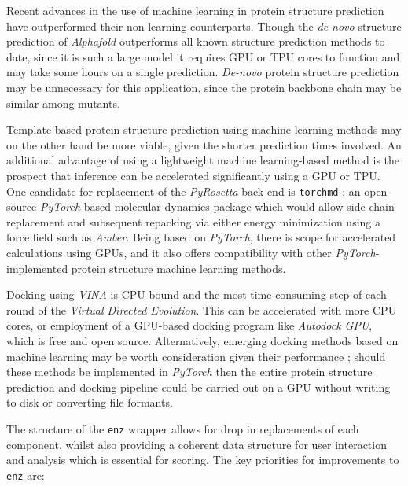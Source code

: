 \documentclass[16pt]{article}
\begin{document}
Recent advances in the use of machine learning in protein structure prediction \cite{jumper2021highly} have outperformed their non-learning counterparts.
Though the \textit{de-novo} structure prediction of \textit{Alphafold} \cite{jumper2021highly} outperforms all known structure prediction methods to date, since it is such a large model it requires GPU or TPU cores to function and may take some hours on a single prediction. 
\textit{De-novo} protein structure prediction may be unnecessary for this application, since the protein backbone chain may be similar among mutants.

Template-based protein structure prediction using machine learning methods may on the other hand be more viable, given the shorter prediction times involved.
An additional advantage of using a lightweight machine learning-based method is the prospect that inference can be accelerated significantly using a GPU or TPU.
One candidate for replacement of the \textit{PyRosetta} back end is \texttt{torchmd} \cite{doerr2021torchmd}: an open-source \textit{PyTorch}-based molecular dynamics package which would allow side chain replacement and subsequent repacking via either energy minimization using a force field such as \textit{Amber}\cite{wang2004development}.
Being based on \textit{PyTorch}, there is scope for accelerated calculations using GPUs, and it also offers compatibility with other \textit{PyTorch}-implemented protein structure machine learning methods.

Docking using \textit{VINA} is CPU-bound and the most time-consuming step of each round of the \textit{Virtual Directed Evolution}.
This can be accelerated with more CPU cores, or employment of a GPU-based docking program like \textit{Autodock GPU}\cite{santos2021accelerating}, which is free and open source.
Alternatively, emerging docking methods based on machine learning may be worth consideration given their performance \cite{doerr2021torchmd}; should these methods be implemented in \textit{PyTorch} then the entire protein structure prediction and docking pipeline could be carried out on a GPU without writing to disk or converting file formants.

The structure of the \texttt{enz} wrapper allows for drop in replacements of each component, whilst also providing a coherent data structure for user interaction and analysis which is essential for scoring.
The key priorities for improvements to \texttt{enz} are:
\end{document}
